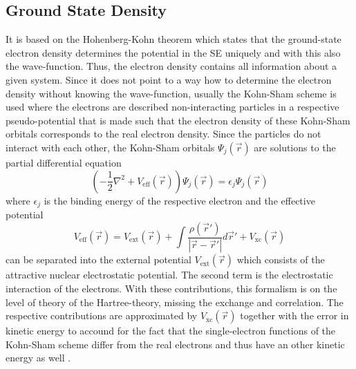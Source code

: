 \subsection{Ground State Density}
It is based on the Hohenberg-Kohn theorem \cite{HohenbergKohn} which states that the ground-state electron density determines the potential in the SE uniquely and with this also the wave-function.
Thus, the electron density contains all information about a given system.
Since it does not point to a way how to determine the electron density without knowing the wave-function, usually the Kohn-Sham scheme \cite{KohnSham} is used where the electrons are described non-interacting particles in a respective pseudo-potential that is made such that the electron density of these Kohn-Sham orbitals corresponds to the real electron density.
Since the particles do not interact with each other, the Kohn-Sham orbitals $\Psi_j(\vec{r})$ are solutions to the partial differential equation
\begin{equation}
\left( -\frac 12  \nabla^2 + V_\text{eff}(\vec{r}) \right) \Psi_j(\vec{r})=\epsilon_j \Psi_j(\vec{r})
\end{equation}
where $\epsilon_j$ is the binding energy of the respective electron and the effective potential 
\begin{equation}
V_\text{eff}(\vec{r})=V_\text{ext}(\vec{r})+ \int \frac{\rho(\vec{r}')}{|\vec{r}-\vec{r}'|} d\vec{r}' + V_\text{xc}(\vec{r})
\end{equation}
can be separated into the external potential $V_\text{ext}(\vec{r})$ which consists of the attractive nuclear electrostatic potential.
The second term is the electrostatic interaction of the electrons. 
With these contributions, this formalism is on the level of theory of the Hartree-theory, missing the exchange and correlation.
The respective contributions are approximated by $V_\text{xc}(\vec{r})$ together with the error in kinetic energy to accound for the fact that the single-electron functions of the Kohn-Sham scheme differ from the real electrons and thus have an other kinetic energy as well \cite{Holthausen}.

